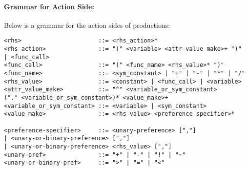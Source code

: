 \paragraph{Grammar for Action Side:}
\label{SYNTAX-pm-actgrammar}    %


Below is a grammar for the action sides of productions:
\begin{verbatim}
<rhs>                      ::= <rhs_action>*
<rhs_action>               ::= "(" <variable> <attr_value_make>+ ")" 
| <func_call>
<func_call>                ::= "(" <func_name> <rhs_value>* ")"
<func_name>                ::= <sym_constant> | "+" | "-" | "*" | "/"
<rhs_value>                ::= <constant> | <func_call> | <variable>
<attr_value_make>          ::= "^" <variable_or_sym_constant>
("." <variable_or_sym_constant>)* <value_make>+
<variable_or_sym_constant> ::= <variable> | <sym_constant>
<value_make>               ::= <rhs_value> <preference_specifier>*

<preference-specifier>     ::= <unary-preference> [","]
| <unary-or-binary-preference> [","]
| <unary-or-binary-preference> <rhs_value> [","]
<unary-pref>               ::= "+" | "-" | "!" | "~"
<unary-or-binary-pref>     ::= ">" | "=" | "<"
\end{verbatim}






